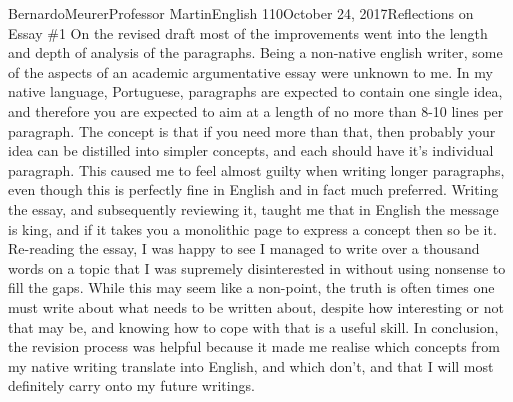 \documentclass[12pt,letterpaper]{article}
\begin{document}
    \begin{mla}{Bernardo}{Meurer}{Professor Martin}{English 110}{October 24, 2017}{Reflections on Essay \#1}
        On the revised draft most of the improvements went into the length and depth of analysis of the paragraphs. Being a non-native english writer, some of the aspects of an academic argumentative essay were unknown to me. In my native language, Portuguese, paragraphs are expected to contain one single idea, and therefore you are expected to aim at a length of no more than 8-10 lines per paragraph. The concept is that if you need more than that, then probably your idea can be distilled into simpler concepts, and each should have it's individual paragraph. This caused me to feel almost guilty when writing longer paragraphs, even though this is perfectly fine in English and in fact much preferred. Writing the essay, and subsequently reviewing it, taught me that in English the message is king, and if it takes you a monolithic page to express a concept then so be it. Re-reading the essay, I was happy to see I managed to write over a thousand words on a topic that I was supremely disinterested in without using nonsense to fill the gaps. While this may seem like a non-point, the truth is often times one must write about what needs to be written about, despite how interesting or not that may be, and knowing how to cope with that is a useful skill. In conclusion, the revision process was helpful because it made me realise which concepts from my native writing translate into English, and which don't, and that I will most definitely carry onto my future writings.
    
    \end{mla}
    
\end{document}
